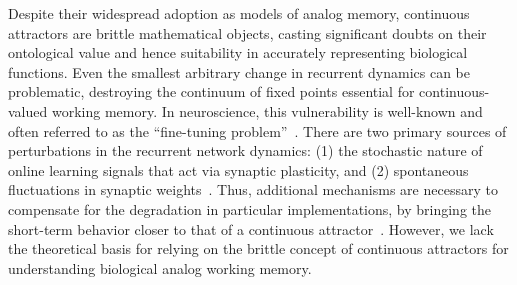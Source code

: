 \documentclass{article} %
\newcounter{ct}
\theoremstyle{definition}
\theoremstyle{remark}
\renewcommand{\cite}{\citep}
\begin{document}


Despite their widespread adoption as models of analog memory, continuous attractors are brittle mathematical objects, casting significant doubts on their ontological value and hence suitability in accurately representing biological functions.
Even the smallest arbitrary change in recurrent dynamics can be problematic, destroying the continuum of fixed points essential for continuous-valued working memory.
In neuroscience, this vulnerability is well-known and often referred to as the ``fine-tuning problem''~\cite{seung1996,Renart2003,chaudhuri2016,Park2023a}.
There are two primary sources of perturbations in the recurrent network dynamics:
(1) the stochastic nature of online learning signals that act via synaptic plasticity, and
(2) spontaneous fluctuations in synaptic weights~\cite{Fusi2007-yg,shimizu2021}.
Thus, additional mechanisms are necessary to compensate for the degradation in particular implementations, by bringing the short-term behavior closer to that of a continuous attractor~\cite{Lim2012,Lim2013,Boerlin2013,Koulakov2002,Renart2003,gu2022}.
However, we lack the theoretical basis for relying on the brittle concept of continuous attractors for understanding biological analog working memory.
\end{document}

